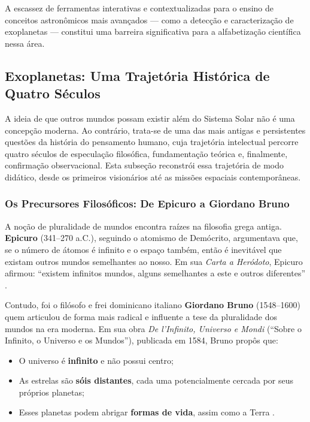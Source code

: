 \documentclass[
	12pt,
	openany,
	oneside,
	a4paper,
	english,
	brazil
]{abntex2}
\begin{document}
A escassez de ferramentas interativas e contextualizadas para o ensino de conceitos astronômicos mais avançados --- como a detecção e caracterização de exoplanetas --- constitui uma barreira significativa para a alfabetização científica nessa área.

\subsection{Exoplanetas: Uma Trajetória Histórica de Quatro Séculos}

A ideia de que outros mundos possam existir além do Sistema Solar não é uma concepção moderna. Ao contrário, trata-se de uma das mais antigas e persistentes questões da história do pensamento humano, cuja trajetória intelectual percorre quatro séculos de especulação filosófica, fundamentação teórica e, finalmente, confirmação observacional. Esta subseção reconstrói essa trajetória de modo didático, desde os primeiros visionários até as missões espaciais contemporâneas.

\subsubsection{Os Precursores Filosóficos: De Epicuro a Giordano Bruno}

A noção de pluralidade de mundos encontra raízes na filosofia grega antiga. \textbf{Epicuro} (341--270 a.C.), seguindo o atomismo de Demócrito, argumentava que, se o número de átomos é infinito e o espaço também, então é inevitável que existam outros mundos semelhantes ao nosso. Em sua \textit{Carta a Heródoto}, Epicuro afirmou: ``existem infinitos mundos, alguns semelhantes a este e outros diferentes'' \cite{dick1982}.

Contudo, foi o filósofo e frei dominicano italiano \textbf{Giordano Bruno} (1548--1600) quem articulou de forma mais radical e influente a tese da pluralidade dos mundos na era moderna. Em sua obra \textit{De l'Infinito, Universo e Mondi} (``Sobre o Infinito, o Universo e os Mundos''), publicada em 1584, Bruno propôs que:

\begin{itemize}
  \item O universo é \textbf{infinito} e não possui centro;
  \item As estrelas são \textbf{sóis distantes}, cada uma potencialmente cercada por seus próprios planetas;
  \item Esses planetas podem abrigar \textbf{formas de vida}, assim como a Terra \cite{bruno1584}.
\end{itemize}
\end{document}
